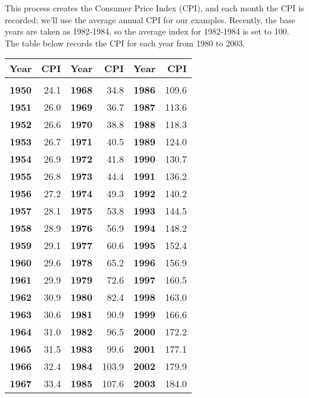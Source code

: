 This process creates the Consumer Price Index (CPI), and each month the CPI is recorded; we'll use the average annual CPI for our examples.  Recently, the base years are taken as 1982-1984, so the average index for 1982-1984 is set to 100.  The table below records the CPI for each year from 1980 to 2003.
\begin{center}
\label{CPI Table}
\begin{tabular}{c r | c r | c r}
\textbf{Year} & CPI & \textbf{Year} & CPI & \textbf{Year} & CPI\\
\hline
& & & & & \\
\textbf{1950} & 24.1 & \textbf{1968} & 34.8 & \textbf{1986} & 109.6\\
\textbf{1951} & 26.0 & \textbf{1969} & 36.7 & \textbf{1987} & 113.6\\
\textbf{1952} & 26.6 & \textbf{1970} & 38.8 & \textbf{1988} & 118.3\\
\textbf{1953} & 26.7 & \textbf{1971} & 40.5 & \textbf{1989} & 124.0\\
\textbf{1954} & 26.9 & \textbf{1972} & 41.8 & \textbf{1990} & 130.7\\
\textbf{1955} & 26.8 & \textbf{1973} & 44.4 & \textbf{1991} & 136.2\\
\textbf{1956} & 27.2 & \textbf{1974} & 49.3 & \textbf{1992} & 140.2\\
\textbf{1957} & 28.1 & \textbf{1975} & 53.8 & \textbf{1993} & 144.5\\
\textbf{1958} & 28.9 & \textbf{1976} & 56.9 & \textbf{1994} & 148.2\\
\textbf{1959} & 29.1 & \textbf{1977} & 60.6 & \textbf{1995} & 152.4\\
\textbf{1960} & 29.6 & \textbf{1978} & 65.2 & \textbf{1996} & 156.9\\
\textbf{1961} & 29.9 & \textbf{1979} & 72.6 & \textbf{1997} & 160.5\\
\textbf{1962} & 30.9 & \textbf{1980} & 82.4 & \textbf{1998} & 163.0\\
\textbf{1963} & 30.6 & \textbf{1981} & 90.9 & \textbf{1999} & 166.6\\
\textbf{1964} & 31.0 & \textbf{1982} & 96.5 & \textbf{2000} & 172.2\\
\textbf{1965} & 31.5 & \textbf{1983} & 99.6 & \textbf{2001} & 177.1\\
\textbf{1966} & 32.4 & \textbf{1984} & 103.9 & \textbf{2002} & 179.9\\
\textbf{1967} & 33.4 & \textbf{1985} & 107.6 & \textbf{2003} & 184.0\\
\end{tabular}
\end{center}

